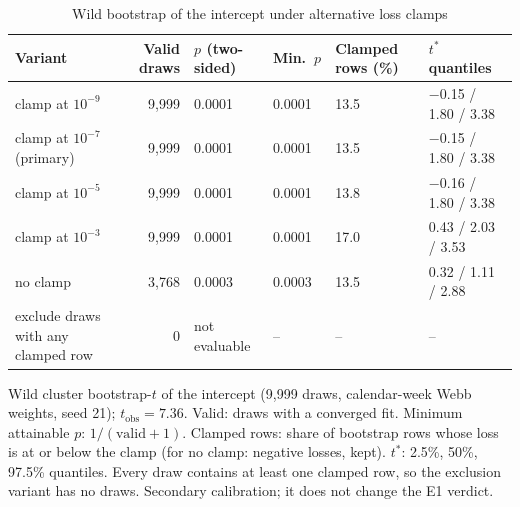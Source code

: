 \begin{table}[!tbp]
\centering
\scriptsize\renewcommand{\arraystretch}{1.15}
\setlength{\tabcolsep}{3pt}
\caption{Wild bootstrap of the intercept under alternative loss clamps}
\label{tab:r2-clamp}
\begin{tabularx}{\linewidth}{@{}Xrllll@{}}
\toprule
Variant & Valid draws & $p$ (two-sided) & Min.\ $p$ & Clamped rows (\%) & $t^*$ quantiles \\
\midrule
clamp at $10^{-9}$ & 9,999 & 0.0001 & 0.0001 & 13.5 & $-$0.15 / 1.80 / 3.38 \\
clamp at $10^{-7}$ (primary) & 9,999 & 0.0001 & 0.0001 & 13.5 & $-$0.15 / 1.80 / 3.38 \\
clamp at $10^{-5}$ & 9,999 & 0.0001 & 0.0001 & 13.8 & $-$0.16 / 1.80 / 3.38 \\
clamp at $10^{-3}$ & 9,999 & 0.0001 & 0.0001 & 17.0 & 0.43 / 2.03 / 3.53 \\
no clamp & 3,768 & 0.0003 & 0.0003 & 13.5 & 0.32 / 1.11 / 2.88 \\
exclude draws with any clamped row & 0 & not evaluable & -- & -- & -- \\
\bottomrule
\end{tabularx}
\par\smallskip\parbox{\linewidth}{\scriptsize\linespread{1.15}\selectfont Wild cluster bootstrap-$t$ of the intercept (9,999 draws, calendar-week Webb weights, seed 21); $t_{\mathrm{obs}}=7.36$. Valid: draws with a converged fit. Minimum attainable $p$: $1/(\text{valid}+1)$. Clamped rows: share of bootstrap rows whose loss is at or below the clamp (for no clamp: negative losses, kept). $t^*$: 2.5\%, 50\%, 97.5\% quantiles. Every draw contains at least one clamped row, so the exclusion variant has no draws. Secondary calibration; it does not change the E1 verdict.}
\end{table}
